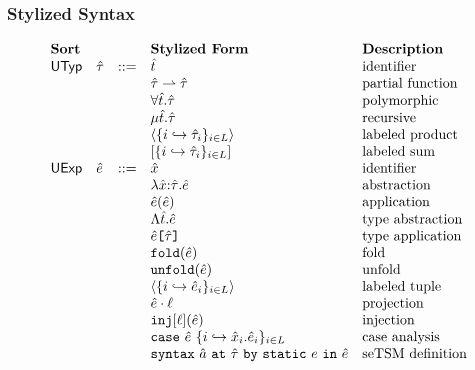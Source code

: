 \subsubsection{Stylized Syntax}
\[\begin{array}{lllllll}
\textbf{Sort} & &  
& \textbf{Stylized Form} & \textbf{Description}\\
\mathsf{UTyp} & {\hat\tau} & ::= 
& {\hat{t}} & \text{identifier}\\
&& 
& {\hat\tau} \rightharpoonup {\hat\tau} & \text{partial function}\\
&&
& \forall {\hat{t}}.{\hat\tau} & \text{polymorphic}\\
&&
& \mu {\hat{t}}.{\hat\tau} & \text{recursive}\\
&&
& \langle \{i \hookrightarrow {\hat\tau}_{i}\}_{i \in L} \rangle & \text{labeled product}\\
&&
& [\{i \hookrightarrow {\hat\tau}_{i}\}_{i \in L}] & \text{labeled sum}\\
\mathsf{UExp} & {\hat e} & ::= 
& {\hat x} & \text{identifier}\\
&&
& \lambda {\hat x}{:}{\hat\tau}.{\hat e} & \text{abstraction}\\
&&
& {\hat e}({\hat e}) & \text{application}\\
&&
& \Lambda {\hat{t}}.{\hat e} & \text{type abstraction}\\
&&
& {\hat e}\texttt{[}{\hat\tau}\texttt{]} & \text{type application}\\
&&
& \texttt{fold}({\hat e}) & \text{fold}\\
&&
& \texttt{unfold}({\hat e}) & \text{unfold}\\
&&
& \langle \{i \hookrightarrow {\hat e}_{i}\}_{i \in L}\rangle & \text{labeled tuple}\\
&&
& {\hat e} \cdot \ell & \text{projection}\\
&&
& \texttt{inj}[\ell]({\hat e}) & \text{injection}\\
&&
& \texttt{case}~{\hat e}~\{i \hookrightarrow {\hat x}_{i}.{\hat e}_{i}\}_{i \in L} & \text{case analysis}\\
&&
& \texttt{syntax}~\hat{a}~\texttt{at}~{\hat\tau}~\texttt{by}~\texttt{static}~e~\texttt{in}~{\hat e} & \text{seTSM definition}\\ 

\end{array}\]
